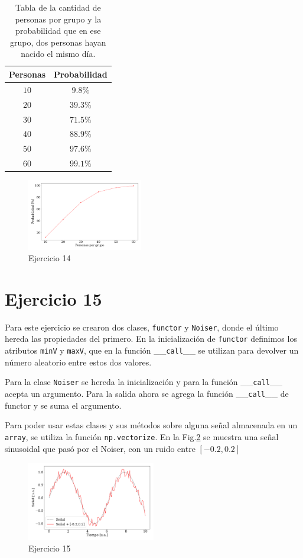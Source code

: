 \begin{table}[h]
	\begin{tabular}{c|c}
Personas & Probabilidad \\ \hline
$10$ & $ 9.8\%$ \\ \hline
$20$ & $ 39.3\%$ \\ \hline
$30$ & $ 71.5\%$ \\ \hline
$40$ & $ 88.9\%$ \\ \hline
$50$ & $ 97.6\%$ \\ \hline
$60$ & $ 99.1\%$ \\ 
	\end{tabular}
\caption{Tabla de la cantidad de personas por grupo y la probabilidad que en ese grupo, dos personas hayan nacido el mismo día.}
\label{tabla}
\end{table}

\begin{figure}[H]
	\centering
	\includegraphics[width=0.45\textwidth]{ejer_14.pdf}
	\caption{Ejercicio 14}
	\label{fig:ejer14}
\end{figure}
	

\section*{Ejercicio 15}

Para este ejercicio se crearon dos clases, \verb|functor| y \verb|Noiser|, donde el último hereda las propiedades del primero. En la inicialización de \verb|functor| definimos los atributos \verb|minV| y \verb|maxV|, que en la función \_\_\verb|call|\_\_ se utilizan para devolver un número aleatorio entre estos dos valores.

Para la clase \verb|Noiser| se hereda la inicialización y para la función \_\_\verb|call|\_\_ acepta un argumento. Para la salida ahora se agrega la función \_\_\verb|call|\_\_ de functor y se suma el argumento.


Para poder usar estas clases y sus métodos sobre alguna señal almacenada en un \verb|array|, se utiliza la función \verb|np.vectorize|. En la Fig.\ref{fig:ejer15} se muestra una señal sinusoidal que pasó por el Noiser, con un ruido entre $[-0.2, 0.2]$

\begin{figure}[H]
	\centering
	\includegraphics[width=0.5\textwidth]{ejer_15.pdf}
	\caption{Ejercicio 15}
	\label{fig:ejer15}
\end{figure}
	

